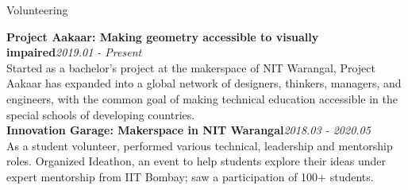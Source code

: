 \documentclass{resume} %
\begin{document}




\begin{rSection}{Volunteering}

{\bf Project Aakaar: Making geometry accessible to visually impaired}\hfill {\em 2019.01 - Present}\\
Started as a bachelor's project at the makerspace of NIT Warangal, Project Aakaar has expanded into a global network of designers, thinkers, managers, and engineers, with the common goal of making technical education accessible in the special schools of developing countries. \\ 

{\bf Innovation Garage: Makerspace in NIT Warangal}\hfill{\em 2018.03 - 2020.05}\\
As a student volunteer, performed various technical, leadership and mentorship roles.  Organized Ideathon, an event to help students explore their ideas under expert mentorship from IIT Bombay; saw a participation of 100+ students.

\end{rSection}






\end{document}
